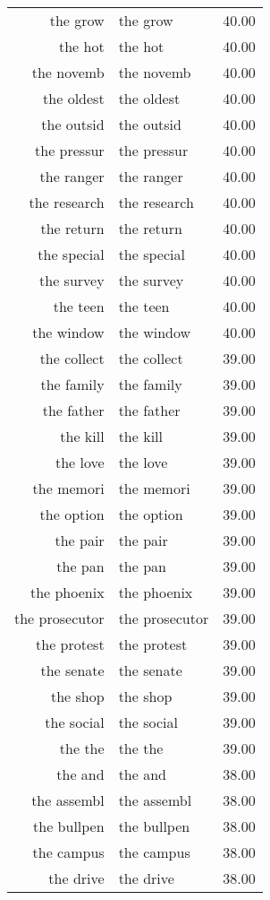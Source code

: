\begin{table}[ht]
\begin{tabular}{rlr}
  the grow & the grow & 40.00 \\ 
  the hot & the hot & 40.00 \\ 
  the novemb & the novemb & 40.00 \\ 
  the oldest & the oldest & 40.00 \\ 
  the outsid & the outsid & 40.00 \\ 
  the pressur & the pressur & 40.00 \\ 
  the ranger & the ranger & 40.00 \\ 
  the research & the research & 40.00 \\ 
  the return & the return & 40.00 \\ 
  the special & the special & 40.00 \\ 
  the survey & the survey & 40.00 \\ 
  the teen & the teen & 40.00 \\ 
  the window & the window & 40.00 \\ 
  the collect & the collect & 39.00 \\ 
  the family & the family & 39.00 \\ 
  the father & the father & 39.00 \\ 
  the kill & the kill & 39.00 \\ 
  the love & the love & 39.00 \\ 
  the memori & the memori & 39.00 \\ 
  the option & the option & 39.00 \\ 
  the pair & the pair & 39.00 \\ 
  the pan & the pan & 39.00 \\ 
  the phoenix & the phoenix & 39.00 \\ 
  the prosecutor & the prosecutor & 39.00 \\ 
  the protest & the protest & 39.00 \\ 
  the senate & the senate & 39.00 \\ 
  the shop & the shop & 39.00 \\ 
  the social & the social & 39.00 \\ 
  the the & the the & 39.00 \\ 
  the and & the and & 38.00 \\ 
  the assembl & the assembl & 38.00 \\ 
  the bullpen & the bullpen & 38.00 \\ 
  the campus & the campus & 38.00 \\ 
  the drive & the drive & 38.00 \\ 

\end{tabular}
\end{table}

